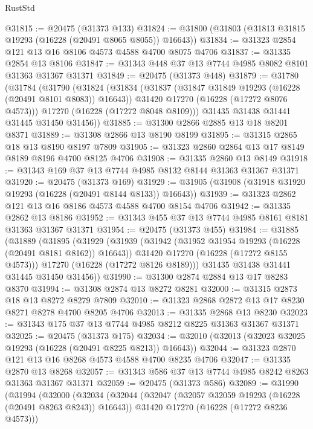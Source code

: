 \begin{lexlean}{RustStd}
\begin{coremodule}
@31815 := @20475 (@31373 @133)
@31824 := @31800 (@31803 (@31813 @31815 @19293 (@16228 (@20491 @8065 @8055)) @16643))
@31834 := @31323 @2854 @121 @13 @16 @8106 @4573 @4588 @4700 @8075 @4706
@31837 := @31335 @2854 @13 @8106
@31847 := @31343 @448 @37 @13 @7744 @4985 @8082 @8101 @31363 @31367 @31371
@31849 := @20475 (@31373 @448)
@31879 := @31780
    (@31784
      (@31790
        (@31824
          (@31834
            (@31837 (@31847 @31849 @19293 (@16228 (@20491 @8101 @8083)) @16643))
            @31420
            @17270
            (@16228 (@17272 @8076 @4573)))
          @17270
          (@16228 (@17272 @8048 @8109)))
        @31435
        @31438
        @31441
        @31445
        @31450
        @31456))
@31885 := @31300 @2866 @2885 @13 @18 @8201 @8371
@31889 := @31308 @2866 @13 @8190 @8199
@31895 := @31315 @2865 @18 @13 @8190 @8197 @7809
@31905 := @31323 @2860 @2864 @13 @17 @8149 @8189 @8196 @4700 @8125 @4706
@31908 := @31335 @2860 @13 @8149
@31918 := @31343 @169 @37 @13 @7744 @4985 @8132 @8144 @31363 @31367 @31371
@31920 := @20475 (@31373 @169)
@31929 := @31905 (@31908 (@31918 @31920 @19293 (@16228 (@20491 @8144 @8133)) @16643))
@31939 := @31323 @2862 @121 @13 @16 @8186 @4573 @4588 @4700 @8154 @4706
@31942 := @31335 @2862 @13 @8186
@31952 := @31343 @455 @37 @13 @7744 @4985 @8161 @8181 @31363 @31367 @31371
@31954 := @20475 (@31373 @455)
@31984 := @31885
    (@31889
      (@31895
        (@31929
          (@31939
            (@31942 (@31952 @31954 @19293 (@16228 (@20491 @8181 @8162)) @16643))
            @31420
            @17270
            (@16228 (@17272 @8155 @4573)))
          @17270
          (@16228 (@17272 @8126 @8189)))
        @31435
        @31438
        @31441
        @31445
        @31450
        @31456))
@31990 := @31300 @2874 @2884 @13 @17 @8283 @8370
@31994 := @31308 @2874 @13 @8272 @8281
@32000 := @31315 @2873 @18 @13 @8272 @8279 @7809
@32010 := @31323 @2868 @2872 @13 @17 @8230 @8271 @8278 @4700 @8205 @4706
@32013 := @31335 @2868 @13 @8230
@32023 := @31343 @175 @37 @13 @7744 @4985 @8212 @8225 @31363 @31367 @31371
@32025 := @20475 (@31373 @175)
@32034 := @32010 (@32013 (@32023 @32025 @19293 (@16228 (@20491 @8225 @8213)) @16643))
@32044 := @31323 @2870 @121 @13 @16 @8268 @4573 @4588 @4700 @8235 @4706
@32047 := @31335 @2870 @13 @8268
@32057 := @31343 @586 @37 @13 @7744 @4985 @8242 @8263 @31363 @31367 @31371
@32059 := @20475 (@31373 @586)
@32089 := @31990
    (@31994
      (@32000
        (@32034
          (@32044
            (@32047 (@32057 @32059 @19293 (@16228 (@20491 @8263 @8243)) @16643))
            @31420
            @17270
            (@16228 (@17272 @8236 @4573)))

\end{coremodule}
\end{lexlean}
